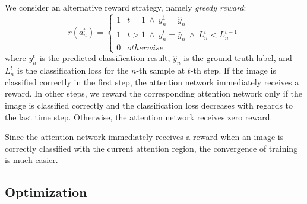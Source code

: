 \documentclass[10pt,twocolumn,letterpaper]{article}
\begin{document}
We consider an alternative reward strategy, namely {\em greedy reward}:
\begin{equation}
r(a^t_n)=\left\{
\begin{array}{cc}
1 & t = 1 \ \wedge \ y^1_n = \hat{y}_n \\
1 & t > 1 \ \wedge \ y^t_n = \hat{y}_{n} \ \wedge \ L^t_n < L^{t-1}_n \\
0 & otherwise \end{array}
\right.
\end{equation}
where $y^t_n$ is the predicted classification result, $\hat{y}_n$ is the ground-truth label, and $L^t_n$ is the classification loss for the $n$-th sample at $t$-th step. If the image is classified correctly in the first step, the attention network immediately receives a reward. In other steps, we reward the corresponding attention network only if the image is classified correctly and the classification loss decreases with regards to the last time step.
Otherwise, the attention network receives zero reward.

Since the attention network immediately receives a reward when an image is correctly classified with the current attention region, the convergence of training is much easier.

\subsection{Optimization}
\end{document}
